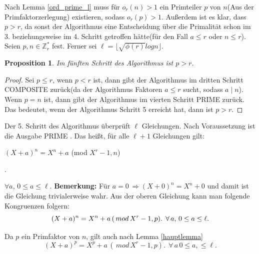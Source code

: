 \documentclass[12pt,oneside]{article}
\newtheorem{prop}{Proposition}[section]
\theoremstyle{remark}
\theoremstyle{definition}
\begin{document}
\smallskip

Nach Lemma \ref{ord_prime_l} muss für  $o_{r}(n) > 1$ ein Primteiler $p$ von $n$(Aus der Primfaktorzerlegung) existieren, sodass $o_{r}(p) > 1$. Außerdem ist es klar, dass $p > r$, da sonst der Algorithmus eine Entscheidung über die Primalität schon im 3. beziehungsweise im 4. Schritt getroffen hätte(für den Fall $a \leq r$ oder $n \leq r$). Seien $p,n \in \mathbb{Z}_{r}^{*}$ fest. Ferner sei  $\ell = \lfloor \sqrt{\phi(r)} log n \rfloor$.\newline\newline

\begin{prop}\label{pGreaterThnr}
Im fünften Schritt des Algorithmus ist $p > r$.
\end{prop}

\begin{proof}
Sei $p \leq r$, wenn $p < r$ ist, dann gibt der Algorithmus im dritten Schritt COMPOSITE zurück(da der Algorithmus Faktoren $a \leq r$ sucht, sodass $a \mid n$). Wenn $p = n$ ist, dann gibt der Algorithmus im vierten Schritt PRIME zurück. Das bedeutet, wenn der Algorithmus Schritt 5 erreicht hat, dann ist $ p > r$.   
\end{proof}

Der 5. Schritt des Algorithmus überprüft $\ell$ Gleichungen. Nach Voraussetzung ist die Ausgabe PRIME . Das heißt, für alle  $\ell + 1$  Gleichungen gilt:\newline\newline
\centerline{$(X + a)^n = X^n + a $ (mod $X^r - 1, n$)}.

$\forall a$, $ 0 \leq a \leq \ell$.\newline\newline
\textbf{Bemerkung:} Für $a = 0 \,  \Rightarrow (X + 0)^n = X^n + 0$ und damit ist die Gleichung trivialerweise wahr.\newline\newline 
Aus der oberen Gleichung kann man folgende Kongruenzen folgern:
\begin{equation}\label{fintro}
(X + a)^n = X^n + a \, (\, mod \, X^r - 1, p).
\; \, \forall\,a, \, 0 \leq a \leq \ell.\newline\newline
\end{equation}

Da $p$ ein Primfaktor von $n$, gilt auch nach Lemma \ref{hauptlemma} \newline
\begin{equation}\label{sintro}
    (X + a)^p = X^p + a \, (\, mod \, X^r - 1, p). \; \, \forall\,a \, 0 \leq a, \leq \ell.
\end{equation}
\end{document}
